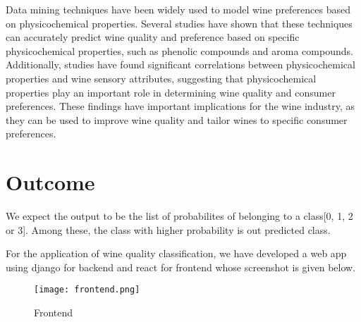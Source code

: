 Data mining techniques have been widely used to model wine preferences based on physicochemical properties. Several studies have shown that these techniques can accurately predict wine quality and preference based on specific physicochemical properties, such as phenolic compounds and aroma compounds. Additionally, studies have found significant correlations between physicochemical properties and wine sensory attributes, suggesting that physicochemical properties play an important role in determining wine quality and consumer preferences. These findings have important implications for the wine industry, as they can be used to improve wine quality and tailor wines to specific consumer preferences.


\section{Outcome}
We expect the output to be the list of probabilites of belonging to a class[0, 1, 2 or 3]. Among these, the class with higher probability is out predicted class. 

For the application of wine quality classification, we have developed a web app using django for backend and react for frontend whose screenshot is given below.

\begin{figure}[H]
    \centering
    \texttt{[image: frontend.png]}
    \caption{Frontend}
\end{figure}

